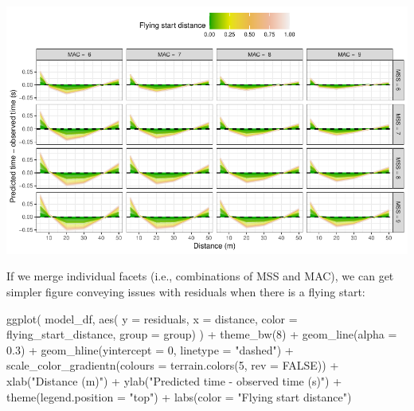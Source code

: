\documentclass[fleqn,10pt,lineno]{wlpeerj} %
\newenvironment{Shaded}{\begin{snugshade}}{\end{snugshade}}
\newcommand{\AttributeTok}[1]{\textcolor[rgb]{0.77,0.63,0.00}{#1}}
\newcommand{\ConstantTok}[1]{\textcolor[rgb]{0.00,0.00,0.00}{#1}}
\newcommand{\DecValTok}[1]{\textcolor[rgb]{0.00,0.00,0.81}{#1}}
\newcommand{\FloatTok}[1]{\textcolor[rgb]{0.00,0.00,0.81}{#1}}
\newcommand{\FunctionTok}[1]{\textcolor[rgb]{0.00,0.00,0.00}{#1}}
\newcommand{\NormalTok}[1]{#1}
\newcommand{\SpecialCharTok}[1]{\textcolor[rgb]{0.00,0.00,0.00}{#1}}
\newcommand{\StringTok}[1]{\textcolor[rgb]{0.31,0.60,0.02}{#1}}
\begin{document}
\begin{center}\includegraphics[width=1\linewidth]{paper_files/figure-latex/unnamed-chunk-37-1} \end{center}

If we merge individual facets (i.e., combinations of MSS and MAC), we can get simpler figure conveying issues with residuals when there is a flying start:

\begin{Shaded}
\begin{Highlighting}[]
\FunctionTok{ggplot}\NormalTok{(}
\NormalTok{  model\_df,}
  \FunctionTok{aes}\NormalTok{(}
    \AttributeTok{y =}\NormalTok{ residuals,}
    \AttributeTok{x =}\NormalTok{ distance,}
    \AttributeTok{color =}\NormalTok{ flying\_start\_distance,}
    \AttributeTok{group =}\NormalTok{ group)}
\NormalTok{) }\SpecialCharTok{+}
  \FunctionTok{theme\_bw}\NormalTok{(}\DecValTok{8}\NormalTok{) }\SpecialCharTok{+}
  \FunctionTok{geom\_line}\NormalTok{(}\AttributeTok{alpha =} \FloatTok{0.3}\NormalTok{) }\SpecialCharTok{+}
  \FunctionTok{geom\_hline}\NormalTok{(}\AttributeTok{yintercept =} \DecValTok{0}\NormalTok{, }\AttributeTok{linetype =} \StringTok{"dashed"}\NormalTok{) }\SpecialCharTok{+}
  \FunctionTok{scale\_color\_gradientn}\NormalTok{(}\AttributeTok{colours =} \FunctionTok{terrain.colors}\NormalTok{(}\DecValTok{5}\NormalTok{, }\AttributeTok{rev =} \ConstantTok{FALSE}\NormalTok{)) }\SpecialCharTok{+}
  \FunctionTok{xlab}\NormalTok{(}\StringTok{"Distance (m)"}\NormalTok{) }\SpecialCharTok{+}
  \FunctionTok{ylab}\NormalTok{(}\StringTok{"Predicted time {-} observed time (s)"}\NormalTok{) }\SpecialCharTok{+}
  \FunctionTok{theme}\NormalTok{(}\AttributeTok{legend.position =} \StringTok{"top"}\NormalTok{) }\SpecialCharTok{+} 
  \FunctionTok{labs}\NormalTok{(}\AttributeTok{color =} \StringTok{"Flying start distance"}\NormalTok{)}
\end{Highlighting}
\end{Shaded}
\end{document}

